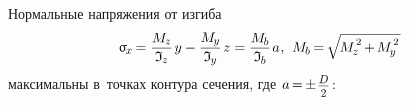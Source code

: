 \documentclass[14pt]{extarticle}
\begin{document}
Нормальные напряжения от изгиба
\[
\upsigma_{\hspace{-0.2ex}\scalebox{.8}{$x$}} \hspace{-0.2ex}
= \displaystyle\frac{M_{\hspace{-0.1ex}\scalebox{.8}{$z$}}}{\mathfrak{I}_{\hspace{-0.1ex}\scalebox{.8}{$z$}}} \hspace{.25ex} y
- \displaystyle\frac{M_{\hspace{-0.1ex}\scalebox{.8}{$y$}}}{\mathfrak{I}_{\hspace{-0.1ex}\scalebox{.8}{$y$}}} \hspace{.25ex} z
= \displaystyle\frac{M_{\hspace{-0.1ex}\scalebox{.8}{$b$}}}{\mathfrak{I}_{\hspace{-0.1ex}\scalebox{.8}{$b$}}} \hspace{.25ex} a
\hspace{.1ex} ,
\hspace{.4em}
M_{\hspace{-0.1ex}\scalebox{.8}{$b$}}
\hspace{-0.2ex}=\hspace{-0.2ex} \sqrt{\hspace{-0.2ex}M_{\hspace{-0.1ex}\scalebox{.8}{$z$}}^{\hspace{.2ex}\raisebox{.2em}{$\scriptstyle 2$}} \hspace{-0.2ex}+\hspace{-0.2ex} M_{\hspace{-0.1ex}\scalebox{.8}{$y$}}^{\hspace{.2ex}\raisebox{.2em}{$\scriptstyle 2$}}\hspace{.2ex}}
\]
максимальны в~точках контура сечения, где
${\hspace{.1ex}a \hspace{-.25ex}=\hspace{-.2ex} \pm \hspace{.2ex} \scalebox{.82}{$ \displaystyle\frac{\raisebox{-.2em}{$D$}}{2} $}\hspace{.2ex}}$:
\end{document}
